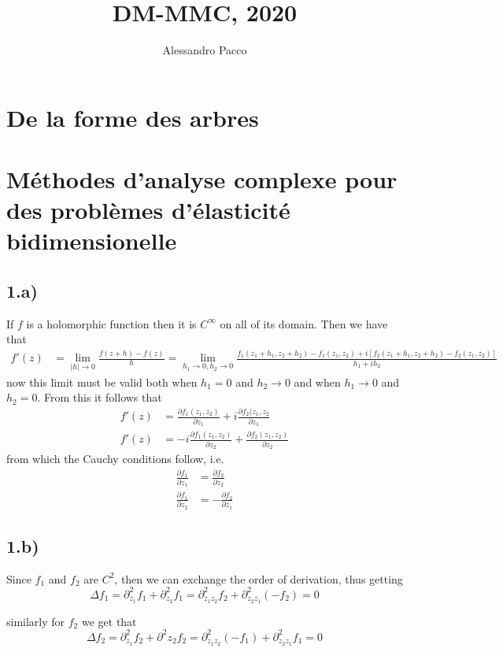 \documentclass[10pt,a4paper]{book}
\author{Alessandro Pacco}
\title{DM-MMC, 2020}
\begin{document}
\maketitle

\tableofcontents

\section*{De la forme des arbres}


\section*{Méthodes d'analyse complexe pour des problèmes d'élasticité bidimensionelle}

\subsection*{1.a)}
If $f$ is a holomorphic function then it is $C^{\infty}$ on all of its domain. 
Then we have that 
\begin{align*}
f'(z)&=\lim_{|h|\to 0}\frac{f(z+h)-f(z)}{h}=\lim_{h_1\to 0,h_2\to 0}\frac{f_1(z_1+h_1,z_2+h_2)-f_1(z_1,z_2)+i[f_2(z_1+h_1,z_2+h_2)-f_2(z_1,z_2)]}{h_1+ih_2}
\end{align*}
now this limit must be valid both when $h_1=0$ and $h_2\to 0 $ and when $h_1\to 0$ and $h_2=0$. From this it follows that 
\begin{align*}
f'(z)&=\frac{\partial f_1(z_1,z_2)}{\partial z_1}+i\frac{\partial f_2(z_1,z_2}{\partial z_1}\\
f'(z)&=-i\frac{\partial f_1(z_1,z_2)}{\partial z_2}+\frac{\partial f_2(z_1,z_2)}{\partial z_2}
\end{align*} from which the Cauchy conditions follow, i.e.
\begin{align*}
\frac{\partial f_1}{\partial z_1}&=\frac{\partial f_2}{\partial z_2}\\
\frac{\partial f_1}{\partial z_2}&=-\frac{\partial f_2}{\partial z_1}
\end{align*}


\subsection*{1.b)}
Since $f_1$ and $f_2$ are $C^2$, then we can exchange the order of derivation, thus getting
$$\Delta f_1=\partial^2_{z_1}f_1+\partial^2_{z_2} f_1=\partial^2_{z_1z_2}f_2+\partial^2_{z_2z_1}(-f_2)=0$$

similarly for $f_2$ we get that 
$$\Delta f_2=\partial^2_{z_1}f_2+\partial^2{z_2}f_2=\partial^2_{z_1z_2}(-f_1)+\partial^2_{z_2z_1}f_1=0$$
\end{document}
